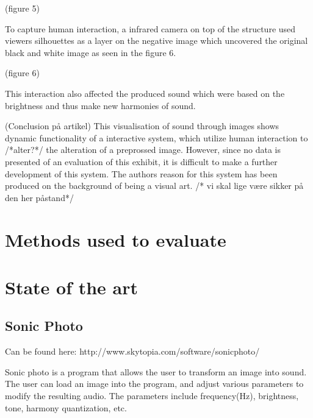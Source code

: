 (figure 5)

To capture human interaction, a infrared camera on top of the structure used viewers silhouettes as a layer on the negative image which uncovered the original black and white image as seen in the figure 6.

(figure 6)

This interaction also affected the produced sound which were based on the brightness and thus make new harmonies of sound. 

(Conclusion på artikel)
This visualisation of sound through images shows dynamic functionality of a interactive system, which utilize human interaction to /*alter?*/ the alteration of a preprossed image. However, since no data is presented of an evaluation of this exhibit, it is difficult to make a further development of this system. The authors reason for this system has been produced on the background of being a visual art. /* vi skal lige være sikker på den her påstand*/   
 

\section{Methods used to evaluate}\label{sub:methodsusedtoevaluate}






\section{State of the art}\label{sec:stateart}

\subsection{Sonic Photo}\label{sub:sonic}
Can be found here: http://www.skytopia.com/software/sonicphoto/

Sonic photo is a program that allows the user to transform an image into sound. The user can load an image into the program, and adjust various parameters to modify the resulting audio. The parameters include  frequency(Hz), brightness, tone, harmony quantization, etc.

